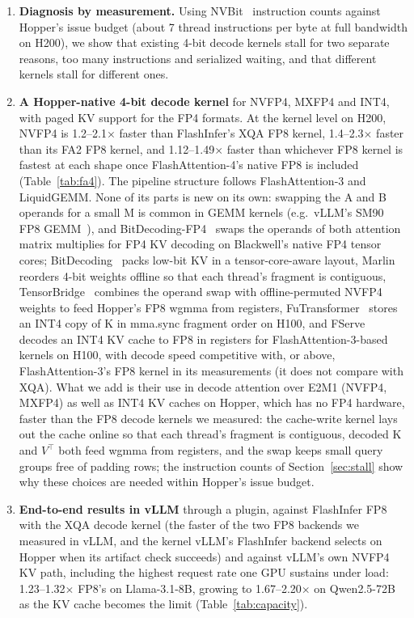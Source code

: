 \documentclass[11pt]{article}
\begin{document}
\begin{enumerate}
  \item \textbf{Diagnosis by measurement.} Using NVBit~\cite{villa2019nvbit} instruction counts against Hopper's issue budget (about 7 thread instructions per byte at full bandwidth on H200), we show that existing 4-bit decode kernels stall for two separate reasons, too many instructions and serialized waiting, and that different kernels stall for different ones.
  \item \textbf{A Hopper-native 4-bit decode kernel} for NVFP4, MXFP4 and INT4, with paged KV support for the FP4 formats. At the kernel level on H200, NVFP4 is 1.2--2.1$\times$ faster than FlashInfer's XQA FP8 kernel, 1.4--2.3$\times$ faster than its FA2 FP8 kernel, and 1.12--1.49$\times$ faster than whichever FP8 kernel is fastest at each shape once FlashAttention-4's native FP8 is included (Table~\ref{tab:fa4}). The pipeline structure follows FlashAttention-3 and LiquidGEMM. None of its parts is new on its own: swapping the A and B operands for a small M is common in GEMM kernels (e.g.\ vLLM's SM90 FP8 GEMM~\cite{vllm20396}), and BitDecoding-FP4~\cite{du2026bitdecodingfp4} swaps the operands of both attention matrix multiplies for FP4 KV decoding on Blackwell's native FP4 tensor cores; BitDecoding~\cite{du2025bitdecoding} packs low-bit KV in a tensor-core-aware layout, Marlin~\cite{frantar2024marlin} reorders 4-bit weights offline so that each thread's fragment is contiguous, TensorBridge~\cite{zou2026tensorbridge} combines the operand swap with offline-permuted NVFP4 weights to feed Hopper's FP8 wgmma from registers, FuTransformer~\cite{wang2026futransformer} stores an INT4 copy of K in mma.sync fragment order on H100, and FServe~\cite{baek2026fserve} decodes an INT4 KV cache to FP8 in registers for FlashAttention-3-based kernels on H100, with decode speed competitive with, or above, FlashAttention-3's FP8 kernel in its measurements (it does not compare with XQA). What we add is their use in decode attention over E2M1 (NVFP4, MXFP4) as well as INT4 KV caches on Hopper, which has no FP4 hardware, faster than the FP8 decode kernels we measured: the cache-write kernel lays out the cache online so that each thread's fragment is contiguous, decoded K and $V^\top$ both feed wgmma from registers, and the swap keeps small query groups free of padding rows; the instruction counts of Section~\ref{sec:stall} show why these choices are needed within Hopper's issue budget.
  \item \textbf{End-to-end results in vLLM} through a plugin, against FlashInfer FP8 with the XQA decode kernel (the faster of the two FP8 backends we measured in vLLM, and the kernel vLLM's FlashInfer backend selects on Hopper when its artifact check succeeds) and against vLLM's own NVFP4 KV path, including the highest request rate one GPU sustains under load: 1.23--1.32$\times$ FP8's on Llama-3.1-8B, growing to 1.67--2.20$\times$ on Qwen2.5-72B as the KV cache becomes the limit (Table~\ref{tab:capacity}).

\end{enumerate}
\end{document}
